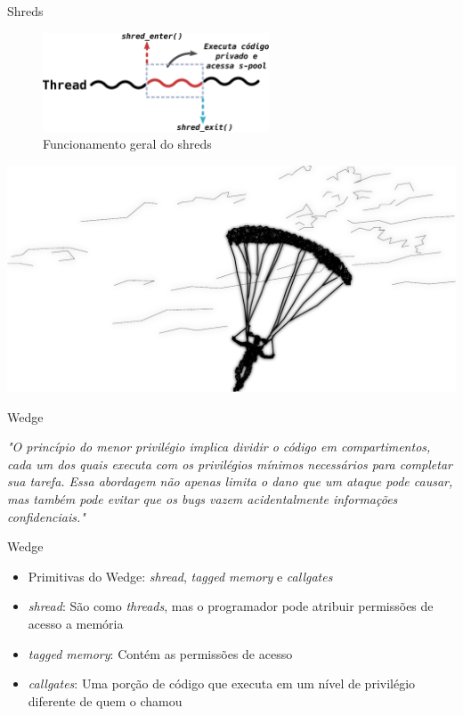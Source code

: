 \documentclass[xcolor={usenames,svgnames,dvipsnames},brazil,english,12pt,aspectratio=149]{beamer}
\begin{document}
\begin{frame}{Shreds}
  \begin{figure}[!h]
    \centering
    \includegraphics[width=0.6\textwidth]{shreds} 
    \caption{Funcionamento geral do shreds}
    \label{fig:shreds}
  \end{figure}
\end{frame}

\begin{frame}[plain]
  \includegraphics[width=\textwidth]{presentation_cap2_three}
\end{frame}

\begin{frame}{Wedge}

  \begin{theorem}

\emph{"O princípio do menor privilégio implica dividir o código em compartimentos,
cada um dos quais executa com os privilégios mínimos necessários para completar
sua tarefa. Essa abordagem não apenas limita o dano que um ataque pode causar,
mas também pode evitar que os \emph{bugs} vazem acidentalmente informações
confidenciais."}%

  \end{theorem}

\end{frame}

\begin{frame}{Wedge}

  \begin{itemize}
    \item Primitivas do Wedge: \emph{shread}, \emph{tagged memory} e \emph{callgates}
    \item \emph{shread}: São como \emph{threads}, mas o programador pode atribuir permissões de acesso a memória
    \item \emph{tagged memory}: Contém as permissões de acesso
    \item \emph{callgates}: Uma porção de código que executa em um nível de privilégio diferente de quem o chamou
  \end{itemize}

\end{frame}
\end{document}
